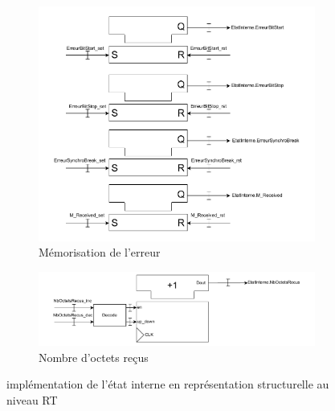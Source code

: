\begin{figure}[htbp]
    \centering
    \begin{subfigure}[b]{0.49\textwidth}
        \centering
        \includegraphics[width=\textwidth]{images/inter/Implementation_ETAT_Erreur.pdf}
        \caption{Mémorisation de l'erreur}
        \label{fig:placeholder}
    \end{subfigure}
    \hfill
    \begin{subfigure}[b]{0.49\textwidth}
        \centering
        \includegraphics[width=\textwidth]{images/inter/Implementation_ETAT_NbOctets.pdf}
        \caption{Nombre d'octets reçus}
        \label{fig:placeholder}
    \end{subfigure}
    \caption{implémentation de l'état interne en représentation structurelle au niveau RT}
    \label{fig:placeholder} %
\end{figure}
